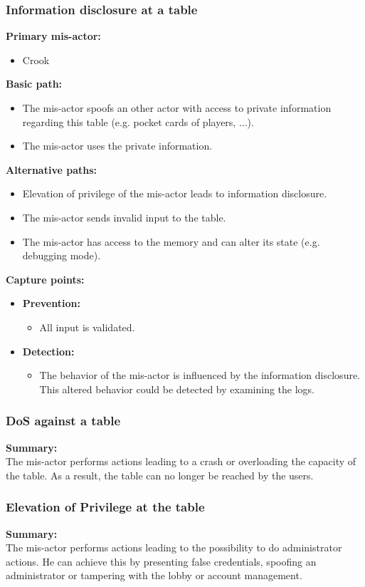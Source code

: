 \documentclass[a4paper,11pt]{report}
\begin{document}
\subsubsection{Information disclosure at a table}
\label{TableCasesI}
\textbf{Primary mis-actor:}
\begin{itemize}
\item Crook
\end{itemize}
\textbf{Basic path:}
\begin{itemize}
\item The mis-actor spoofs an other actor with access to private information regarding this table
(e.g. pocket cards of players, ...).
\item The mis-actor uses the private information.
\end{itemize}
\textbf{Alternative paths:}
\begin{itemize}
\item Elevation of privilege of the mis-actor leads to information disclosure.
\item The mis-actor sends invalid input to the table.
\item The mis-actor has access to the memory and can alter its state (e.g. debugging mode).
\end{itemize}
\textbf{Capture points:}
\begin{itemize}
\item \textbf{Prevention:}
\begin{itemize}
\item All input is validated.
\end{itemize}
\item \textbf{Detection:}
\begin{itemize}
\item The behavior of the mis-actor is influenced by the information disclosure. This altered behavior could be detected by examining the logs.
\end{itemize}
\end{itemize}

\subsubsection{DoS against a table}
\label{TableCasesD}
\textbf{Summary:} \\
The mis-actor performs actions leading to a crash or overloading the capacity of the table. As a result, the table can no longer be reached by the users.

\subsubsection{Elevation of Privilege at the table}
\label{TableCasesE}
\textbf{Summary:} \\
The mis-actor performs actions leading to the possibility to do administrator actions. He can achieve this by presenting false credentials, spoofing an administrator or tampering with the lobby or account management.
\end{document}
